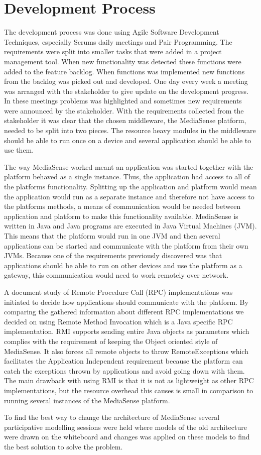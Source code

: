 \section{Development Process}
The development process was done using Agile Software Development Techniques, especially Scrums daily meetings and Pair Programming. The requirements were split into smaller tasks that were added in a project management tool. When new functionality was detected these functions were added to the feature backlog. When functions was implemented new functions from the backlog was picked out and developed. 
One day every week a meeting was arranged with the stakeholder to give update on the development progress. In these meetings problems was highlighted and sometimes new requirements were announced by the stakeholder. With the requirements collected from the stakeholder it was clear that the chosen middleware, the MediaSense platform, needed to be split into two pieces. The resource heavy modules in the middleware should be able to run once on a device and several application should be able to use them. 

The way MediaSense worked meant an application was started together with the platform behaved as a single instance. Thus, the application had access to all of the platforms functionality. Splitting up the application and platform would mean the application would run as a separate instance and therefore not have access to the platforms methods, a means of communication would be needed between application and platform to make this functionality available. MediaSense is written in Java and Java programs are executed in Java Virtual Machines (JVM). This means that the platform would run in one JVM and then several applications can be started and communicate with the platform from their own JVMs. Because one of the requirements previously discovered was that applications should be able to run on other devices and use the platform as a gateway, this communication would need to work remotely over network.

A document study of Remote Procedure Call (RPC) implementations was initiated to decide how applications should communicate with the platform. By comparing the gathered information about different RPC implementations we decided on using Remote Method Invocation which is a Java specific RPC implementation. RMI supports sending entire Java objects as parameters which complies with the requirement of keeping the Object oriented style of MediaSense. It also forces all remote objects to throw RemoteExceptions which facilitates the Application Independent requirement because the platform can catch the exceptions thrown by applications and avoid going down with them. The main drawback with using RMI is that it is not as lightweight as other RPC implementations, but the resource overhead this causes is small in comparison to running several instances of the MediaSense platform.

To find the best way to change the architecture of MediaSense several participative modelling sessions were held where models of the old architecture were drawn on the whiteboard and changes was applied on these models to find the best solution to solve the problem.
